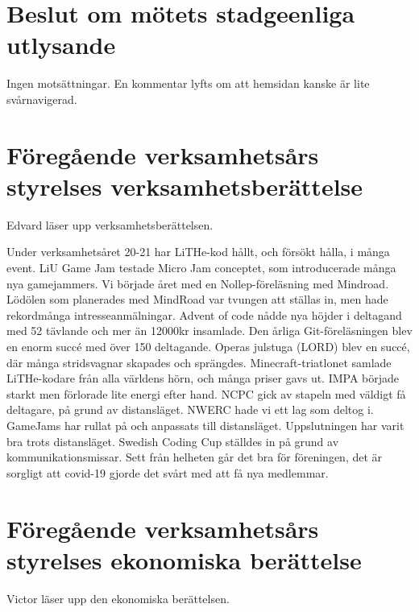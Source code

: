 \documentclass[a4paper]{article}
\begin{document}
\section{Beslut om mötets stadgeenliga utlysande}

Ingen motsättningar. En kommentar lyfts om att hemsidan kanske är lite
svårnavigerad.

\section{Föregående verksamhetsårs styrelses verksamhetsberättelse}

Edvard läser upp verksamhetsberättelsen.

\begin{displayquote}
  Under verksamhetsåret 20-21 har LiTHe-kod hållt,
  och försökt hålla, i många event.
  LiU Game Jam testade Micro Jam conceptet, som introducerade
  många nya gamejammers.
  Vi började året med en Nollep-föreläsning med Mindroad.
  Lödölen som planerades med MindRoad var tvungen att ställas in,
  men hade rekordmånga intresseanmälningar.
  Advent of code nådde nya höjder i deltagand med 52
  tävlande och mer än 12000kr insamlade.
  Den årliga Git-föreläsningen blev en enorm succé
  med över 150 deltagande.
  Operas julstuga (LORD) blev en succé, där många stridsvagnar skapades och sprängdes.
  Minecraft-triatlonet samlade LiTHe-kodare från alla världens
  hörn, och många priser gavs ut.
  IMPA började starkt men förlorade lite energi efter hand.
  NCPC gick av stapeln med väldigt få deltagare,
  på grund av distansläget.
  NWERC hade vi ett lag som deltog i.
  GameJams har rullat på och anpassats till distansläget. Uppslutningen har varit bra trots distansläget.
  Swedish Coding Cup ställdes in på grund av kommunikationsmissar.
  Sett från helheten går det bra för föreningen, det är sorgligt att
  covid-19 gjorde det svårt med att få nya medlemmar.
\end{displayquote}

\section{Föregående verksamhetsårs styrelses ekonomiska berättelse}

Victor läser upp den ekonomiska berättelsen.
\end{document}
